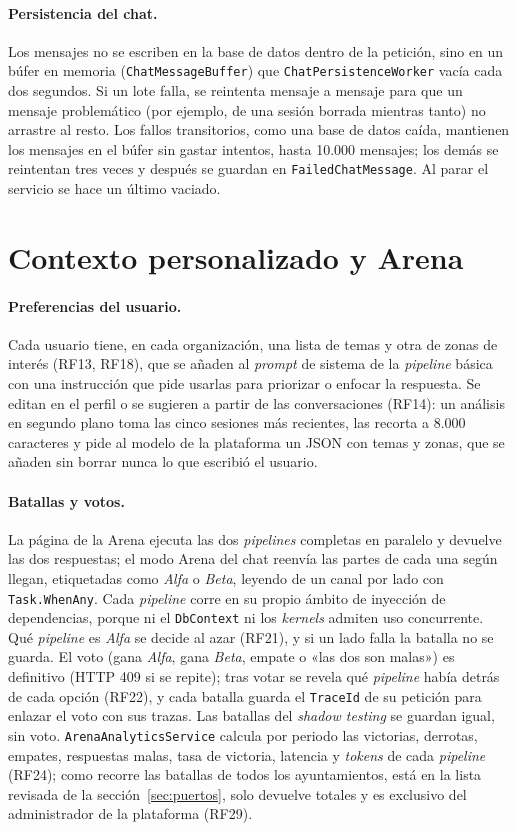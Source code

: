 \paragraph{Persistencia del chat.} Los mensajes no se escriben en la base de datos dentro de la petición, sino en un búfer en memoria (\texttt{ChatMessageBuffer}) que \texttt{ChatPersistenceWorker} vacía cada dos segundos. Si un lote falla, se reintenta mensaje a mensaje para que un mensaje problemático (por ejemplo, de una sesión borrada mientras tanto) no arrastre al resto. Los fallos transitorios, como una base de datos caída, mantienen los mensajes en el búfer sin gastar intentos, hasta 10.000 mensajes; los demás se reintentan tres veces y después se guardan en \texttt{FailedChatMessage}. Al parar el servicio se hace un último vaciado.

\section{Contexto personalizado y Arena}
\label{sec:impl-arena-detalle}

\paragraph{Preferencias del usuario.} Cada usuario tiene, en cada organización, una lista de temas y otra de zonas de interés (RF13, RF18), que se añaden al \emph{prompt} de sistema de la \emph{pipeline} básica con una instrucción que pide usarlas para priorizar o enfocar la respuesta. Se editan en el perfil o se sugieren a partir de las conversaciones (RF14): un análisis en segundo plano toma las cinco sesiones más recientes, las recorta a 8.000 caracteres y pide al modelo de la plataforma un JSON con temas y zonas, que se añaden sin borrar nunca lo que escribió el usuario.

\paragraph{Batallas y votos.} La página de la Arena ejecuta las dos \emph{pipelines} completas en paralelo y devuelve las dos respuestas; el modo Arena del chat reenvía las partes de cada una según llegan, etiquetadas como \emph{Alfa} o \emph{Beta}, leyendo de un canal por lado con \texttt{Task.WhenAny}. Cada \emph{pipeline} corre en su propio ámbito de inyección de dependencias, porque ni el \texttt{DbContext} ni los \emph{kernels} admiten uso concurrente. Qué \emph{pipeline} es \emph{Alfa} se decide al azar (RF21), y si un lado falla la batalla no se guarda. El voto (gana \emph{Alfa}, gana \emph{Beta}, empate o «las dos son malas») es definitivo (HTTP 409 si se repite); tras votar se revela qué \emph{pipeline} había detrás de cada opción (RF22), y cada batalla guarda el \texttt{TraceId} de su petición para enlazar el voto con sus trazas. Las batallas del \emph{shadow testing} se guardan igual, sin voto. \texttt{ArenaAnalyticsService} calcula por periodo las victorias, derrotas, empates, respuestas malas, tasa de victoria, latencia y \emph{tokens} de cada \emph{pipeline} (RF24); como recorre las batallas de todos los ayuntamientos, está en la lista revisada de la sección~\ref{sec:puertos}, solo devuelve totales y es exclusivo del administrador de la plataforma (RF29).

